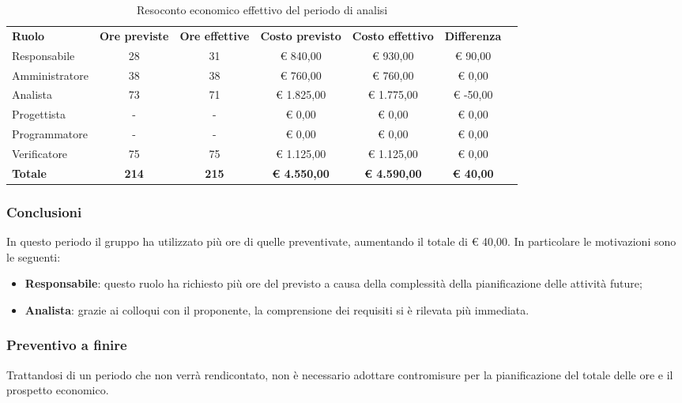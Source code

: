 \documentclass[../piano-di-progetto.tex]{subfiles}
\begin{document}
  \begin{table}[H]
    \centering
    \begin{tabular}{lcccccc}
      \rowcolor{lightgray}
      \textbf{Ruolo}  & \textbf{Ore previste} & \textbf{Ore effettive} & \textbf{Costo previsto} & \textbf{Costo effettivo} & \textbf{Differenza} \\
      Responsabile    & 28                    & 31                     & € 840,00                & € 930,00                 & € 90,00    \\
      Amministratore  & 38                    & 38                     & € 760,00                & € 760,00                 & € 0,00     \\
      Analista        & 73                    & 71                     & € 1.825,00              & € 1.775,00               & € -50,00   \\
      Progettista     & -                     & -                      & € 0,00                  & € 0,00                   & € 0,00     \\
      Programmatore   & -                     & -                      & € 0,00                  & € 0,00                   & € 0,00     \\
      Verificatore    & 75                    & 75                     & € 1.125,00              & € 1.125,00               & € 0,00     \\
      \textbf{Totale} & \textbf{214}          & \textbf{215}           & \textbf{€ 4.550,00}     & \textbf{€ 4.590,00}      & \textbf{€ 40,00}   
      
    \end{tabular}
    \caption{Resoconto economico effettivo del periodo di analisi}
  \end{table}


\subsubsection{Conclusioni}
In questo periodo il gruppo ha utilizzato più ore di quelle preventivate, aumentando il totale di € 40,00. In particolare le motivazioni sono le seguenti:
\begin{itemize}
    \item \textbf{Responsabile}: questo ruolo ha richiesto più ore del previsto a causa della complessità della pianificazione delle attività future;
    
 \item   \textbf{Analista}: grazie ai colloqui con il proponente, la comprensione dei requisiti si è rilevata più immediata.
\end{itemize}

\subsubsection{Preventivo a finire}
Trattandosi di un periodo che non verrà rendicontato, non è necessario adottare contromisure per la pianificazione del totale delle ore e il prospetto economico.







\end{document}
